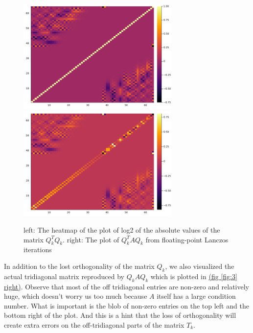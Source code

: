 \documentclass[]{article}
\theoremstyle{definition}
\begin{document}
            \begin{figure}[H]
                \centering
                \includegraphics[width=8cm]{fig3.png}
                \includegraphics[width=8cm]{fig4.png}
                \caption{left: The heatmap of the plot of log2 of the absolute values of the matrix $Q^T_kQ_k$. right: The plot of $Q_k^TAQ_k$ from floating-point Lanczos iterations}
            \end{figure}\label{fig:3}
            In addition to the lost orthogonality of the matrix $Q_k$, we also visualized the actual tridiagonal matrix reproduced by $Q_kAQ_k$ which is plotted in \hyperref[fig:3]{(fig \ref*{fig:3} right)}. Observe that most of the off tridiagonal entries are non-zero and relatively huge, which doesn't worry us too much because $A$ itself has a large condition number. What is important is the blob of non-zero entries on the top left and the bottom right of the plot. And this is a hint that the loss of orthogonality will create extra errors on the off-tridiagonal parts of the matrix $T_k$. 
\end{document}
